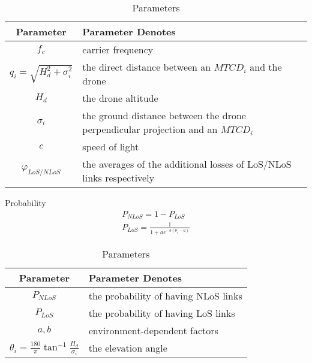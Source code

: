 \documentclass{beamer}
\begin{document}
\begin{frame}{}
\begin{block}{}
\begin{table}[]
        \centering
\renewcommand{\arraystretch}{1.4}
        \begin{tabular}{||c|m{7cm}||}
            \hline
            Parameter & Parameter Denotes \\ 
            \hline
            \hline
            $f_c$ & carrier frequency\\ 
            \hline
            $q_i=\sqrt{H_d^2+\sigma_i^2}$ & the direct distance between an $MTCD_i$ and the drone\\ 
            \hline
            $H_d$ & the drone altitude\\ 
            \hline
            $\sigma_i$ & the ground distance between the drone perpendicular projection and an $MTCD_i$\\
            \hline
            $c$ & speed of light\\ 
            \hline
            $\varphi_{LoS/NLoS}$ & the averages of the additional losses of LoS/NLoS links respectively\\
            \hline
        \end{tabular}
        \caption{Parameters}
        \label{tab:Table1}
    \end{table}
\end{block}
\end{frame}
\begin{frame}{}
\begin{block}{Probability}
\begin{align}
    P_{NLoS}=1-P_{LoS}\\
    P_{LoS}=\frac{1}{1 + a e^{-b\left(\theta_i-a\right)}}
\end{align}
\end{block}
\begin{block}{}
\begin{table}[]
        \centering
\renewcommand{\arraystretch}{1.4}
        \begin{tabular}{||c|m{7cm}||}
            \hline
            Parameter & Parameter Denotes \\ 
            \hline
            \hline
            $P_{NLoS}$ & the probability of having NLoS links\\ 
            \hline
            $P_{LoS}$ & the probability of having LoS links\\ 
            \hline
            $a, b$ & environment-dependent factors\\
            \hline
            $\theta_i=\frac{180}{\pi}\tan^{-1}{\frac{H_d}{\sigma_i}}$ & the elevation angle\\
            \hline
        \end{tabular}
        \caption{Parameters}
        \label{tab:Table2}
    \end{table}
\end{block}
\end{frame}
\end{document}
